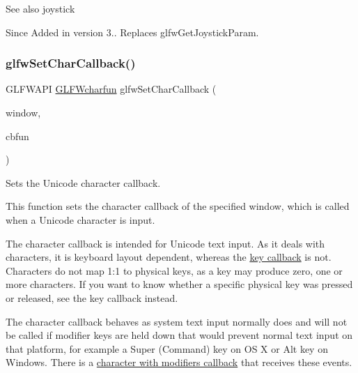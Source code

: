 \begin{DoxySeeAlso}{See also}
joystick
\end{DoxySeeAlso}
\begin{DoxySince}{Since}
Added in version 3.. Replaces {\ttfamily glfw\+Get\+Joystick\+Param}. 
\end{DoxySince}
\mbox{\label{group__input_ga07b2959b23dc3e466ce7475746021002}} 
\subsubsection{\texorpdfstring{glfw\+Set\+Char\+Callback()}{glfwSetCharCallback()}}
{\footnotesize\ttfamily G\+L\+F\+W\+A\+PI \hyperlink{group__input_gabf24451c7ceb1952bc02b17a0d5c3e5f}{G\+L\+F\+Wcharfun} glfw\+Set\+Char\+Callback (\begin{DoxyParamCaption}\item[{\hyperlink{group__window_ga3c96d80d363e67d13a41b5d1821f3242}{G\+L\+F\+Wwindow} $\ast$}]{window,  }\item[{\hyperlink{group__input_gabf24451c7ceb1952bc02b17a0d5c3e5f}{G\+L\+F\+Wcharfun}}]{cbfun }\end{DoxyParamCaption})}



Sets the Unicode character callback. 

This function sets the character callback of the specified window, which is called when a Unicode character is input.

The character callback is intended for Unicode text input. As it deals with characters, it is keyboard layout dependent, whereas the \hyperlink{group__input_gaa73bb92f628a2a0be9c132d56f19362c}{key callback} is not. Characters do not map 1\+:1 to physical keys, as a key may produce zero, one or more characters. If you want to know whether a specific physical key was pressed or released, see the key callback instead.

The character callback behaves as system text input normally does and will not be called if modifier keys are held down that would prevent normal text input on that platform, for example a Super (Command) key on OS X or Alt key on Windows. There is a \hyperlink{group__input_gae6eee0bda7429bfe8028615847cf6795}{character with modifiers callback} that receives these events.


